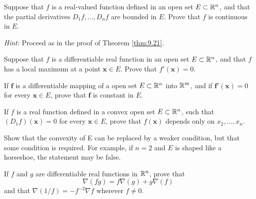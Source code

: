 \begin{myExercise}
    \label{ex:9.7}
    Suppose that $f$ is a real-valued function defined in an open set $E \subset {\protect\mathbb R}^n$, 
    and that the partial derivatives $D_1f, \dots , D_nf$ are bounded in $E$. 
    Prove that $f$ is continuous in $E$.

    \emph{Hint:} Proceed as in the proof of Theorem \ref{thm:9.21}.
\end{myExercise}


\begin{myExercise}
    \label{ex:9.8}
    Suppose that $f$ is a differentiable real function in an open set $E \subset {\protect\mathbb R}^n$, 
    and that $f$ has a local maximum at a point $\mathbf{x} \in E$. 
    Prove that $f'(\mathbf{x}) = 0$.
\end{myExercise}


\begin{myExercise}
    \label{ex:9.9}
    If $\mathbf{f}$ is a differentiable mapping of a  open set $E \subset {\protect\mathbb R}^n$ into ${\protect\mathbb R}^m$, 
    and if $\mathbf{f}'(\mathbf{x}) = 0$ for every $\mathbf{x} \in E$, 
    prove that $\mathbf{f}$ is constant in $E$.
\end{myExercise}


\begin{myExercise}
    \label{ex:9.10}
    If $f$ is a real function defined in a convex open set $E \subset {\protect\mathbb R}^n$, 
    such that $(D_1f)(\mathbf{x}) = 0$ for every $\mathbf{x} \in E$, 
    prove that $f(\mathbf{x})$ depends only on $x_2, ... , x_n$.

    Show that the convexity of E can be replaced by a weaker condition, but that some condition is required. 
    For example, if $n = 2$ and $E$ is shaped like a horseshoe, the statement may be false.
\end{myExercise}



\begin{myExercise}
    \label{ex:9.11}
    If $f$ and $g$ are differentiable real functions in ${\protect\mathbb R}^n$, 
    prove that
    \begin{equation*}
        \nabla (fg) = 
        f\nabla (g) + 
        g\nabla (f) 
    \end{equation*}
    and that $\nabla (1/f)=-f^{-2}\nabla f$ wherever $f \neq 0$.
\end{myExercise}


